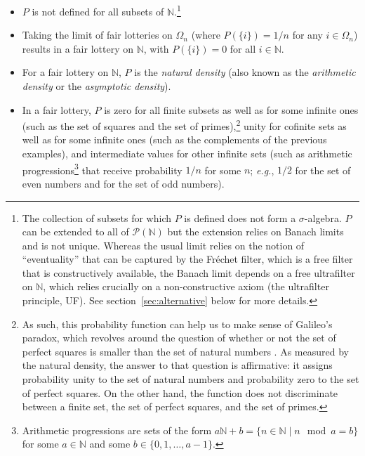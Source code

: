 \begin{itemize}
  \item $P$ is not defined for all subsets of $\mathbb{N}$.\footnote{The collection of subsets for which $P$ is defined does not form a $\sigma$-algebra. $P$ can be extended to all of $\mathcal{P}(\mathbb{N})$ but the extension relies on Banach limits and is not unique. Whereas the usual limit relies on the notion of ``eventuality'' that can be captured by the Fr\'echet filter, which is a free filter that is constructively available, the Banach limit depends on a free ultrafilter on $\mathbb{N}$, which relies crucially on a non-constructive axiom (the ultrafilter principle, UF). See section~\ref{sec:alternative} below for more details.}
  \item Taking the limit of fair lotteries on $\Omega_n$ (where $P(\{i\})=1/n$ for any $i \in \Omega_n$) results in a fair lottery on $\mathbb{N}$, with $P(\{i\})=0$ for all $i \in \mathbb{N}$.
  \item For a fair lottery on $\mathbb{N}$, $P$ is the \textit{natural density} (also known as the \textit{arithmetic density} or the \textit{asymptotic density}).
  \item In a fair lottery, $P$ is zero for all finite subsets as well as for some infinite ones (such as the set of squares and the set of primes),\footnote{As such, this probability function can help us to make sense of Galileo's paradox, which revolves around the question of whether or not the set of perfect squares is smaller than the set of natural numbers \citep[see][]{Mancosu:2009}. As measured by the natural density, the answer to that question is affirmative: it assigns probability unity to the set of natural numbers and probability zero to the set of perfect squares. On the other hand, the function does not discriminate between a finite set, the set of perfect squares, and the set of primes.} unity for cofinite sets as well as for some infinite ones (such as the complements of the previous examples), and intermediate values for other infinite sets (such as arithmetic progressions\footnote{Arithmetic progressions are sets of the form $a\mathbb{N}+b = \{ n \in \mathbb{N} \mid n \mod a = b \}$ for some $a \in \mathbb{N}$ and some $b \in \{0,1,\ldots,a-1\}$.} that receive probability $1/n$ for some $n$; \textit{e.g.}, $1/2$ for the set of even numbers and for the set of odd numbers).
\end{itemize}

